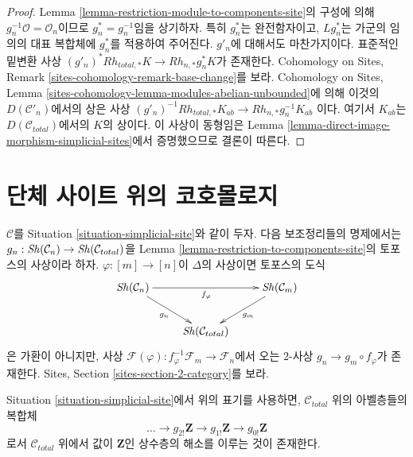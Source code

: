 \begin{proof}
Lemma \ref{lemma-restriction-module-to-components-site}의 구성에 의해
$g_n^{-1}\mathcal{O} = \mathcal{O}_n$이므로
$g_n^* = g_n^{-1}$임을 상기하자. 특히 $g_n^*$는 완전함자이고,
$Lg_n^*$는 가군의 임의의 대표 복합체에 $g_n^*$를 적용하여 주어진다.
$g'_n$에 대해서도 마찬가지이다. 표준적인 밑변환 사상
$(g'_n)^*Rh_{total, *}K \to Rh_{n, *}g_n^*K$가 존재한다.
Cohomology on Sites, Remark \ref{sites-cohomology-remark-base-change}를 보라.
Cohomology on Sites, Lemma
\ref{sites-cohomology-lemma-modules-abelian-unbounded}에 의해 이것의
$D(\mathcal{C}'_n)$에서의 상은 사상
$(g'_n)^{-1}Rh_{total, *}K_{ab} \to Rh_{n, *}g_n^{-1}K_{ab}$
이다. 여기서 $K_{ab}$는 $D(\mathcal{C}_{total})$에서의 $K$의 상이다.
이 사상이 동형임은 Lemma
\ref{lemma-direct-image-morphism-simplicial-sites}에서 증명했으므로
결론이 따른다.
\end{proof}


\section{단체 사이트 위의 코호몰로지}
\label{section-cohomology-simplicial-sites}

\noindent
$\mathcal{C}$를 Situation \ref{situation-simplicial-site}와 같이 두자.
다음 보조정리들의 명제에서는
$g_n : \mathop{\mathit{Sh}}\nolimits(\mathcal{C}_n) \to \mathop{\mathit{Sh}}\nolimits(\mathcal{C}_{total})$을
Lemma \ref{lemma-restriction-to-components-site}의 토포스의 사상이라 하자.
$\varphi : [m] \to [n]$이 $\Delta$의 사상이면 토포스의 도식
$$
\xymatrix{
\Sh(\mathcal{C}_n) \ar[rd]_{g_n} \ar[rr]_{f_\varphi} & &
\Sh(\mathcal{C}_m) \ar[ld]^{g_m} \\
& \Sh(\mathcal{C}_{total})
}
$$
은 가환이 아니지만, 사상
$\mathcal{F}(\varphi) : f_\varphi^{-1}\mathcal{F}_m \to \mathcal{F}_n$에서
오는 $2$-사상 $g_n \to g_m \circ f_\varphi$가 존재한다.
Sites, Section \ref{sites-section-2-category}를 보라.

\begin{lemma}
\label{lemma-simplicial-resolution-Z-site}
Situation \ref{situation-simplicial-site}에서 위의 표기를 사용하면,
$\mathcal{C}_{total}$ 위의 아벨층들의 복합체
$$
\ldots \to g_{2!}\mathbf{Z} \to g_{1!}\mathbf{Z} \to g_{0!}\mathbf{Z}
$$
로서 $\mathcal{C}_{total}$ 위에서 값이 $\mathbf{Z}$인 상수층의
해소를 이루는 것이 존재한다.
\end{lemma}

